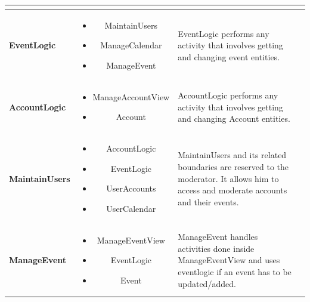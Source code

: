 \documentclass{article}
\begin{document}
\begin{tabular}{l c l @{} l}
	\multicolumn{2}{c}{} \\
	\hline
	
\textbf{EventLogic}&\parbox{.45\textwidth}{
            \begin{itemize}
                \item MaintainUsers
                \item ManageCalendar
                \item ManageEvent
            \end{itemize} }
&\parbox{.3\textwidth}{
            EventLogic performs any activity that involves getting and changing event entities.  } \\
	\hline
\textbf{AccountLogic}&\parbox{.45\textwidth}{
            \begin{itemize}
                \item ManageAccountView
                \item Account
            \end{itemize} }
&\parbox{.3\textwidth}{
           AccountLogic performs any activity that involves getting and changing Account entities.   } \\
	\hline
\textbf{MaintainUsers}&\parbox{.45\textwidth}{
            \begin{itemize}
                \item AccountLogic
                \item EventLogic
                \item UserAccounts
                \item UserCalendar
            \end{itemize} }
&\parbox{.3\textwidth}{
           MaintainUsers and its related boundaries are reserved to the moderator. It allows him to access and moderate accounts and their events.  } \\
	\hline
\textbf{ManageEvent}&\parbox{.45\textwidth}{
            \begin{itemize}
                \item ManageEventView
                \item EventLogic
                \item Event
            \end{itemize} }
&\parbox{.3\textwidth}{
          ManageEvent handles activities done inside ManageEventView and uses eventlogic if an event has to be updated/added.  } \\
	\hline
\end{tabular}
\end{document}
